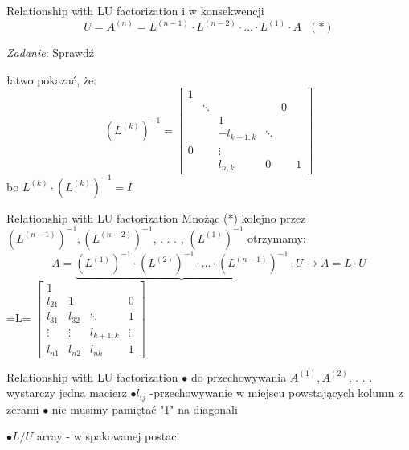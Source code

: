 \begin{frame}{Relationship with LU factorization}
i w konsekwencji
$$
U=A^{(n)}=L^{(n-1)}\cdot L^{(n-2)}\cdot\ldots\cdot L^{(1)}\cdot A \ \ \ (*)
$$
\begin{flushright}
{\it Zadanie}: Sprawdź
\end{flushright}
łatwo pokazać, że:
$$
(L^{(k)})^{-1}=\begin{bmatrix}
1 \\
 & \ddots & & & 0 \\
 & & 1\\
 & &   -l_{k+1,k}  & \ddots\\
 0 & &  \vdots \\
 & & l_{n,k} &  0  & & 1

\end{bmatrix}
$$
bo $L^{(k)}\cdot(L^{(k)})^{-1}=I$
\end{frame}
\begin{frame}{Relationship with LU factorization}
Mnożąc (*) kolejno przez $(L^{(n-1)})^{-1}, (L^{(n-2)})^{-1}$, . . . , $(L^{(1)})^{-1}$ otrzymamy:
$$
A=\underbrace{(L^{(1)})^{-1}\cdot(L^{(2)})^{-1}\cdot\ldots\cdot(L^{(n-1)})^{-1}}\cdot U\rightarrow A=L\cdot U
$$
\hspace{17mm}
=L=
$
\begin{bmatrix}
1 & & & \\
l_{21}  & 1 & & 0 \\
l_{31} & l_{32} & \ddots & 1 \\
\vdots & \vdots & l_{k+1,k} & \vdots \\
l_{n1} & l_{n2} & l_{nk} & 1
\end{bmatrix}
$
\end{frame}
\begin{frame}{Relationship with LU factorization}
$\bullet$ do przechowywania $A^{(1)}, A^{(2)}$, . . . wystarczy jedna macierz \newline
$\bullet l_{ij}$ -przechowywanie w miejscu powstających kolumn z zerami \newline
$\bullet$ nie musimy pamiętać "1" na diagonali

$\bullet L/U$ array - w spakowanej postaci
\end{frame}